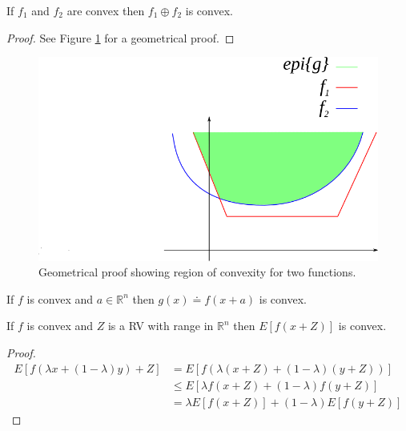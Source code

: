 \documentclass[lecture,12pt,]{pcms-l}
\begin{document}
\begin{theorem}
\label{th:maxconvex}
If $f_1$ and $f_2$ are convex then $f_1\oplus f_2$ is convex.
\end{theorem}

\begin{proof}
See Figure \ref{fig:05convexOplusProof} for a geometrical proof.
\end{proof}

\begin{figure}[ht!]
	\centering
	\includegraphics[width=.4\textwidth]{images/05convexOplusProof}
	\caption{Geometrical proof showing region of convexity for two functions.}
	\label{fig:05convexOplusProof}
\end{figure}

\begin{theorem}
\label{th:argconvex}
If $f$ is convex and $a\in\mathbb{R}^n$ then $g(x)\doteq f(x+a)$ is convex.
\end{theorem}

\begin{theorem}
\label{th:randconvex}
If $f$ is convex and $Z$ is a RV with range in $\mathbb{R}^n$ then $E[f(x+Z)]$ is convex.
\end{theorem}

\begin{proof}
\begin{align*}
E[f(\lambda x+(1-\lambda)y) + Z] &= E[f(\lambda(x+Z) + (1-\lambda)(y+Z))] \\
&\leq E[\lambda f(x+Z) + (1-\lambda)f(y+Z)] \\
&= \lambda E[f(x+Z)] + (1-\lambda)E[f(y+Z)]
\end{align*}
\end{proof}
\end{document}
